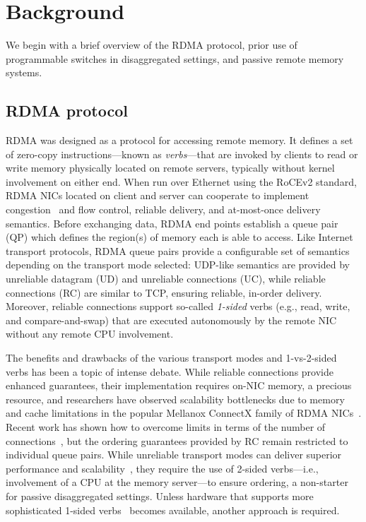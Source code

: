 \section{Background}

We begin with a brief overview of the RDMA protocol, prior use of
programmable switches in disaggregated settings, and passive remote
memory systems.

\subsection{RDMA protocol}

RDMA was designed as a protocol for accessing remote memory. It
defines a set of zero-copy instructions---known as
\textit{verbs}---that are invoked by clients to read or write memory
physically located on remote servers, typically without kernel
involvement on either end.  When run over Ethernet using the RoCEv2
standard, RDMA NICs located on client and server can cooperate to
implement congestion~\cite{hpcc,dcqcn} and flow control, reliable
delivery, and at-most-once delivery semantics.  Before exchanging
data, RDMA end points establish a queue pair (QP) which defines the
region(s) of memory each is able to access.  Like Internet transport
protocols, RDMA queue pairs provide a configurable set of semantics
depending on the transport mode selected: UDP-like semantics are
provided by unreliable datagram (UD) and unreliable connections (UC),
while reliable connections (RC) are similar to TCP, ensuring reliable,
in-order delivery.  Moreover, reliable connections support so-called
\emph{1-sided} verbs (e.g., read, write, and compare-and-swap) that
are executed autonomously by the remote NIC without any remote CPU
involvement.

The benefits and drawbacks of the various transport modes and
1-vs-2-sided verbs has been a topic of intense debate.  While reliable
connections provide enhanced guarantees, their implementation requires
on-NIC memory, a precious resource, and researchers have observed
scalability bottlenecks due to memory and cache limitations in the
popular Mellanox ConnectX family of RDMA
NICs~\cite{farm,fasst,erpc,lite,design-guidelines}.  Recent work has
shown how to overcome limits in terms of the number of
connections~\cite{storm,flock}, but the ordering guarantees provided
by RC remain restricted to individual queue pairs.  While unreliable
transport modes can deliver superior performance and
scalability~\cite{fasst}, they require the use of 2-sided
verbs---i.e., involvement of a CPU at the memory server---to ensure
ordering, a non-starter for passive disaggregated settings.  Unless
hardware that supports more sophisticated 1-sided verbs~\cite{filemr,rma,star}
becomes available, another approach is required.



